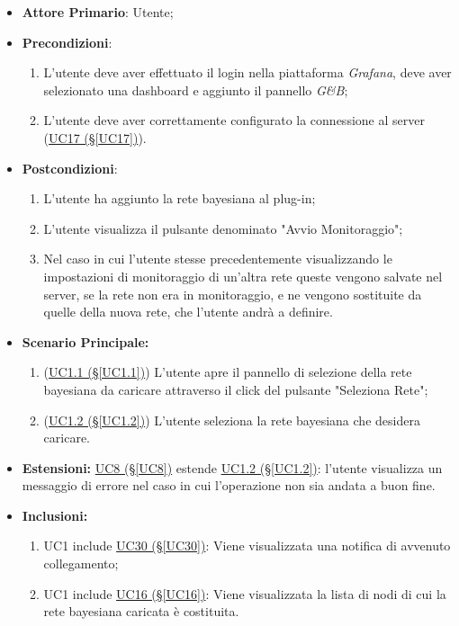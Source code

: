 \begin{itemize}
	\item \textbf{Attore Primario}: Utente;
	\item \textbf{Precondizioni}:
		\begin{enumerate}
			\item L'utente deve aver effettuato il login nella piattaforma \textit{Grafana}, deve aver selezionato una dashboard e aggiunto il pannello \textit{G\&B};
			\item L'utente deve aver correttamente configurato la connessione al server (\hyperref[UC17]{UC17 (§\ref*{UC17})}).
		\end{enumerate}
	\item \textbf{Postcondizioni}:
	\begin{enumerate}
		\item L'utente ha aggiunto la rete bayesiana al plug-in;
		\item L'utente visualizza il pulsante denominato "Avvio Monitoraggio";
		\item Nel caso in cui l'utente stesse precedentemente visualizzando le impostazioni di monitoraggio di un'altra rete queste vengono salvate nel server, se la rete non era in monitoraggio, e ne vengono sostituite da quelle della nuova rete, che l'utente andrà a definire.
	\end{enumerate}
	\item \textbf{Scenario Principale:}
	\begin{enumerate}
		\item (\hyperref[UC1.1]{UC1.1 (§\ref*{UC1.1})}) L'utente apre il pannello di selezione della rete bayesiana da caricare attraverso il click del pulsante "Seleziona Rete";
		\item (\hyperref[UC1.2]{UC1.2 (§\ref*{UC1.2})}) L'utente seleziona la rete bayesiana che desidera caricare.
	\end{enumerate}
	\item \textbf{Estensioni:} \hyperref[UC8]{UC8 (§\ref*{UC8})} estende \hyperref[UC1.2]{UC1.2 (§\ref*{UC1.2})}: l'utente visualizza un messaggio di errore nel caso in cui l'operazione non sia andata a buon fine.
	\item \textbf{Inclusioni:} 
	\begin{enumerate}
		\item UC1 include \hyperref[UC30]{UC30 (§\ref*{UC30})}: Viene visualizzata una notifica di avvenuto collegamento;
		\item UC1 include \hyperref[UC16]{UC16 (§\ref*{UC16})}: Viene visualizzata la lista di nodi di cui la rete bayesiana caricata è costituita.
	\end{enumerate}
\end{itemize}

